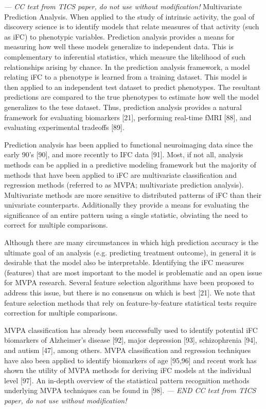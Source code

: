 \documentclass[5p]{elsarticle}
\begin{document}
\emph{ --- CC text from TICS paper, do not use without modification!}
Multivariate Prediction Analysis. When applied to the study of intrinsic
activity, the goal of discovery science is to identify models that relate
measures of that activity (such as iFC) to phenotypic variables.  Prediction
analysis provides a means for measuring how well these models generalize to
independent data.  This is complementary to inferential statistics, which
measure the likelihood of such relationships arising by chance. In the
prediction analysis framework, a model relating iFC to a phenotype is learned
from a training dataset. This model is then applied to an independent test
dataset to predict phenotypes.  The resultant predictions are compared to the
true phenotypes to estimate how well the model generalizes to the tese dataset.
Thus, prediction analysis provides a natural framework for evaluating biomarkers
[21], performing real-time fMRI [88], and evaluating experimental tradeoffs
[89]. 

Prediction analysis has been applied to functional neuroimaging data since the early 90’s [90], and more
recently to IFC data [91]. Most, if not all, analysis methods can be applied in a predictive modeling
framework but the majority of methods that have been applied to iFC are multivariate classification and
regression methods (referred to as MVPA; multivariate prediction analysis). Multivariate methods are more
sensitive to distributed patterns of iFC than their univariate counterparts. Additionally they provide a
means for evaluating the significance of an entire pattern using a single statistic, obviating the need
to correct for multiple comparisons. 

Although there are many circumstances in which high prediction accuracy is the ultimate goal of an
analysis (e.g. predicting treatment outcome), in general it is desirable that the model also be
interpretable. Identifying the iFC measures (features) that are most important to the model is
problematic and an open issue for MVPA research. Several feature selection algorithms have been proposed
to address this issue, but there is no consensus on which is best [21]. We note that feature selection
methods that rely on feature-by-feature statistical tests require correction for multiple comparisons. 

MVPA classification has already been successfully used to identify potential iFC biomarkers of Alzheimer’s
disease [92], major depression [93], schizophrenia [94], and autism [47], among others. MVPA
classification and regression techniques have also been applied to identify biomarkers of age [95,96]
and recent work has shown the utility of MVPA methods for deriving iFC models at the individual
level [97]. An in-depth overview of the statistical pattern recognition methods underlying MVPA
techniques can be found in [98].
\emph{ --- END CC text from TICS paper, do not use without modification!}
\end{document}
